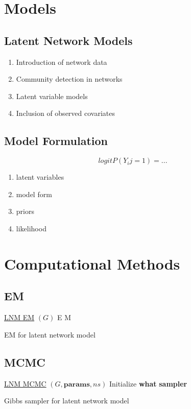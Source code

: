 \documentclass{article}
\begin{document}
\section{Models} \label{Models}
\subsection{Latent Network Models}
\begin{enumerate}
    \item Introduction of network data
    \item Community detection in networks
    \item Latent variable models 
    \item Inclusion of observed covariates
\end{enumerate}

\subsection{Model Formulation}
\[ logit P(Y_ij = 1) = ... \]
\begin{enumerate}
	\item latent variables
	\item model form
	\item priors
	\item likelihood
\end{enumerate}

\section{Computational Methods} \label{Computational Methods}

\subsection{EM}

\begin{algorithm*}
    \underline{LNM EM} $(G)$\;
    E\;
    M\;
    \caption{EM for latent network model}
\end{algorithm*}

\subsection{MCMC}

\begin{algorithm*}
    \underline{LNM MCMC} $(G, \textbf{params}, ns)$\;
    Initialize \textbf{what}\;
      {
      \textbf{sampler}
      }
    \caption{Gibbs sampler for latent network model}
\end{algorithm*}
\end{document}
